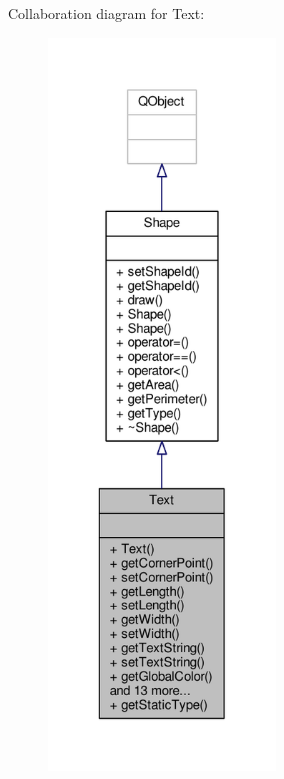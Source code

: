 Collaboration diagram for Text\+:\nopagebreak
\begin{figure}[H]
\begin{center}
\leavevmode
\includegraphics[height=550pt]{classText__coll__graph}
\end{center}
\end{figure}
